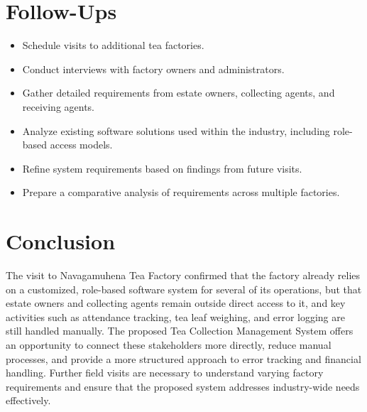 \documentclass[11pt,a4paper]{article}
\begin{document}
\section*{Follow-Ups}
\begin{itemize}[nosep]
    \item Schedule visits to additional tea factories.
    \item Conduct interviews with factory owners and administrators.
    \item Gather detailed requirements from estate owners, collecting agents, and receiving agents.
    \item Analyze existing software solutions used within the industry, including role-based access models.
    \item Refine system requirements based on findings from future visits.
    \item Prepare a comparative analysis of requirements across multiple factories.
\end{itemize}

\section*{Conclusion}

The visit to Navagamuhena Tea Factory confirmed that the factory already relies on a customized, role-based software system for several of its operations, but that estate owners and collecting agents remain outside direct access to it, and key activities such as attendance tracking, tea leaf weighing, and error logging are still handled manually. The proposed Tea Collection Management System offers an opportunity to connect these stakeholders more directly, reduce manual processes, and provide a more structured approach to error tracking and financial handling. Further field visits are necessary to understand varying factory requirements and ensure that the proposed system addresses industry-wide needs effectively.
\end{document}
